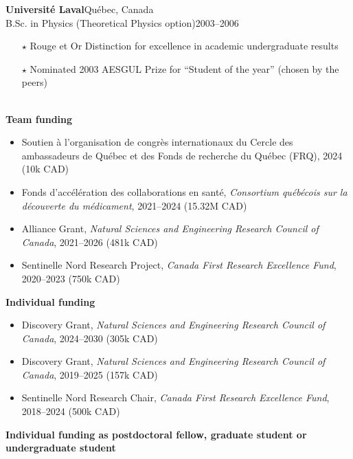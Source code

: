\documentclass[11pt]{article}
\newcommand{\TitreSection}[1]{\colorbox{background}{\makebox[\textwidth-0.5em][c]{\Large\textrm{\textsc{#1}}}}\vspace{0.75\baselineskip}\\}
\begin{document}
%
\parbox[t]{\textwidth}{%
\textbf{Universit\'e Laval}\hfill Qu\'ebec, Canada\\
B.Sc. in Physics (Theoretical Physics option)\hfill 2003--2006
\begin{itemize}[leftmargin=1.5em]\small
  \item[$\star$] Rouge et Or Distinction for excellence in academic undergraduate results
  \item[$\star$] Nominated 2003 AESGUL Prize for ``Student of the year'' (chosen by the peers)
\end{itemize}
\vspace{0.75\baselineskip}}
%
%
%
%
%
\TitreSection{Funding and Awards}
%
\textbf{Team funding}
%
\begin{itemize}
  \item Soutien à l'organisation de congrès internationaux du Cercle des ambassadeurs de Québec et des Fonds de recherche du Québec (FRQ), 2024 (10k CAD)
  \item Fonds d'accélération des collaborations en santé, \textit{Consortium québécois sur la découverte du médicament}, 2021--2024 (15.32M CAD)
  \item Alliance Grant, \textit{Natural Sciences and Engineering Research Council of Canada}, 2021--2026 (481k CAD)
  \item Sentinelle Nord Research Project, \textit{Canada First Research Excellence Fund}, 2020--2023 (750k CAD)
\end{itemize}
%
%
%
\textbf{Individual funding}
%
\begin{itemize}
  \item Discovery Grant, \textit{Natural Sciences and Engineering Research Council of Canada}, 2024--2030 (305k CAD)
  \item Discovery Grant, \textit{Natural Sciences and Engineering Research Council of Canada}, 2019--2025 (157k CAD)
  \item Sentinelle Nord Research Chair, \textit{Canada First Research Excellence Fund}, 2018--2024 (500k CAD)
\end{itemize}
%
%
%
\textbf{Individual funding as postdoctoral fellow, graduate student or undergraduate student}
%
\end{document}
